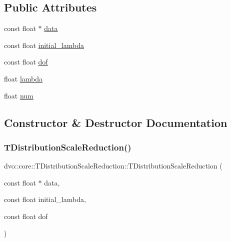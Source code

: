 \subsection*{Public Attributes}
\begin{DoxyCompactItemize}
\item 
const float $\ast$ \mbox{\hyperlink{structdvo_1_1core_1_1_t_distribution_scale_reduction_a6259219785a8c3d0419af876182eea8f}{data}}
\item 
const float \mbox{\hyperlink{structdvo_1_1core_1_1_t_distribution_scale_reduction_af54018029273dd4a0fded86ace3a6527}{initial\+\_\+lambda}}
\item 
const float \mbox{\hyperlink{structdvo_1_1core_1_1_t_distribution_scale_reduction_a351c0ce2b6638b1e0ebd6992d7299feb}{dof}}
\item 
float \mbox{\hyperlink{structdvo_1_1core_1_1_t_distribution_scale_reduction_a94c67a95846c5067b0305fd748d3c461}{lambda}}
\item 
float \mbox{\hyperlink{structdvo_1_1core_1_1_t_distribution_scale_reduction_a9935c3abdf8b53f63b42a3b7c2825bb1}{num}}
\end{DoxyCompactItemize}


\subsection{Constructor \& Destructor Documentation}
\mbox{\label{structdvo_1_1core_1_1_t_distribution_scale_reduction_aa7e02d101f48cc6442918820908efb1c}} 
\subsubsection{\texorpdfstring{T\+Distribution\+Scale\+Reduction()}{TDistributionScaleReduction()}\hspace{0.1cm}{\footnotesize\ttfamily [1/2]}}
{\footnotesize\ttfamily dvo\+::core\+::\+T\+Distribution\+Scale\+Reduction\+::\+T\+Distribution\+Scale\+Reduction (\begin{DoxyParamCaption}\item[{const float $\ast$}]{data,  }\item[{const float}]{initial\+\_\+lambda,  }\item[{const float}]{dof }\end{DoxyParamCaption})\hspace{0.3cm}{\ttfamily [inline]}}

